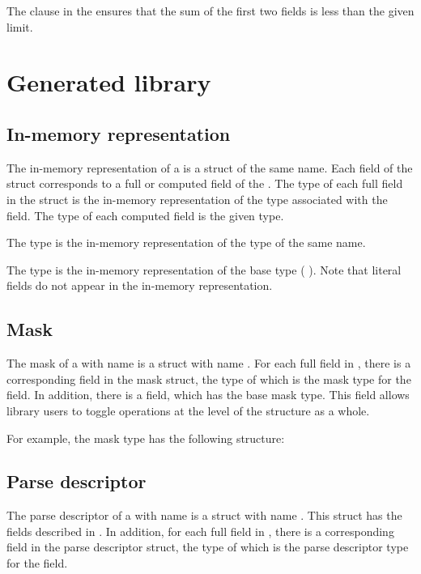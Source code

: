 The \Pwhere{} clause in the  \Pstruct{} ensures
that the sum of the first two fields is less than the given limit.


\section{Generated library}
\subsection{In-memory representation}
\label{sec:structs-rep}
The in-memory representation of a \Pstruct{} is a \C{} struct of the
same name.  Each field of the \C{} struct corresponds to a full or
computed field of the \Pstruct{}.  The type of each full field in
the \C{} struct is the in-memory representation of the \PADSL{} type
associated with the field.  The type of each computed field is 
the given \C{} type. 

The \C{} type  is the in-memory representation of
the \PADSL{} type of the same name.

The type  is the in-memory representation of the base
type  (\cf{} ).  Note that literal fields
do not appear in the in-memory representation. 

\subsection{Mask}
\label{sec:structs-masks}
The mask of a \Pstruct{} with name  is a \C{} struct 
with name .  For each full field in
, there is a corresponding field in the mask struct, the
type of which is the mask type for
the field.  In addition, there is a 
 field, which has the base mask type.  This field allows
library users to toggle operations at the level of the structure as a
whole. 

For example, the mask type  has the
following structure:


\subsection{Parse descriptor}
\label{sec:structs-parse-descriptors}
The parse descriptor of a \Pstruct{} with name  is a \C{}
struct with name .  This struct has the fields
described in . In addition, for
each full field in , there is a corresponding field in
the parse descriptor struct, the type of which is the parse descriptor
type for the field.

